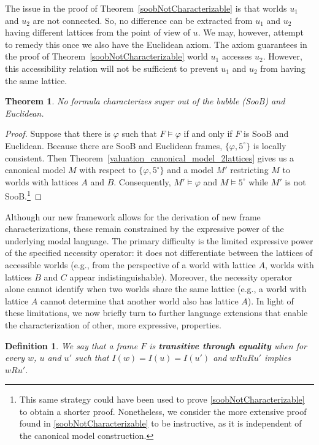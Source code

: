 \documentclass{amsart}
\newtheorem{definition}{Definition}[section]
\newtheorem{theorem}{Theorem}[section]
\begin{document}
The issue in the proof of Theorem~\ref{soobNotCharacterizable} is that worlds $u_1$ and $u_2$ are not connected. So, no difference can be extracted from $u_1$ and $u_2$ having different lattices from the point of view of $u$. We may, however, attempt to remedy this once we also have the Euclidean axiom. The axiom guarantees in the proof of Theorem~\ref{soobNotCharacterizable} world $u_1$ accesses $u_2$. However, this accessibility relation will not be sufficient to prevent $u_1$ and $u_2$ from having the same lattice. 

\begin{theorem}
    No formula characterizes super out of the bubble (SooB) and Euclidean.
\end{theorem}

\begin{proof}
    Suppose that there is $\varphi$ such that $F \vDash \varphi$ if and only if $F$ is SooB and Euclidean. Because there are SooB and Euclidean frames, $\{\varphi, 5^\circ\}$ is locally consistent. Then Theorem~\ref{valuation_canonical_model_2lattices} gives us a canonical model $M$ with respect to $\{\varphi, 5^\circ\}$ and a model $M'$ restricting $M$ to worlds with lattices $A$ and $B$. Consequently, $M' \vDash \varphi$ and $M \vDash 5^\circ$ while $M'$ is not SooB.\footnote{This same strategy could have been used to prove \cref{soobNotCharacterizable} to obtain a shorter proof. Nonetheless, we consider the more extensive proof found in \cref{soobNotCharacterizable} to be instructive, as it is independent of the canonical model construction.}
\end{proof}

Although our new framework allows for the derivation of new frame characterizations, these remain constrained by the expressive power of the underlying modal language. The primary difficulty is the limited expressive power of the specified necessity operator: it does not differentiate between the lattices of accessible worlds (e.g., from the perspective of a world with lattice $A$, worlds with lattices $B$ and $C$ appear indistinguishable). Moreover, the necessity operator alone cannot identify when two worlds share the same lattice (e.g., a world with lattice $A$ cannot determine that another world also has lattice $A$). In light of these limitations, we now briefly turn to further language extensions that enable the characterization of other, more expressive, properties.

\begin{definition}
    We say that a frame $F$ is \textbf{transitive through equality} when for every $w$, $u$ and $u'$ such that $I(w) = I(u) = I(u')$ and $w R u R u'$ implies $w R u'$.
\end{definition}
\end{document}
